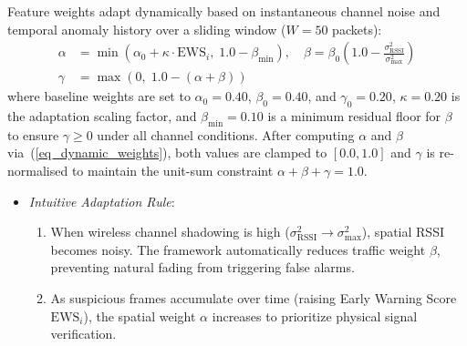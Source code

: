 \documentclass[conference]{IEEEtran}
\begin{document}
Feature weights adapt dynamically based on instantaneous channel noise and temporal anomaly history over a sliding window ($W=50$ packets):
\begin{equation}
\label{eq_dynamic_weights}
\begin{aligned}
\alpha &= \min\!\left(\alpha_0 + \kappa \cdot \text{EWS}_i,\; 1.0 - \beta_{\min}\right), \quad \beta = \beta_0 \left(1.0 - \frac{\sigma_{\text{RSSI}}^2}{\sigma_{\text{max}}^2}\right) \\
\gamma &= \max\!\left(0,\; 1.0 - (\alpha + \beta)\right)
\end{aligned}
\end{equation}
where baseline weights are set to $\alpha_0 = 0.40$, $\beta_0 = 0.40$, and $\gamma_0 = 0.20$, $\kappa = 0.20$ is the adaptation scaling factor, and $\beta_{\min} = 0.10$ is a minimum residual floor for $\beta$ to ensure $\gamma \ge 0$ under all channel conditions. After computing $\alpha$ and $\beta$ via~(\ref{eq_dynamic_weights}), both values are clamped to $[0.0, 1.0]$ and $\gamma$ is re-normalised to maintain the unit-sum constraint $\alpha + \beta + \gamma = 1.0$.
\begin{itemize}
    \item \textit{Intuitive Adaptation Rule}: 
    \begin{enumerate}
        \item When wireless channel shadowing is high ($\sigma_{\text{RSSI}}^2 \to \sigma_{\text{max}}^2$), spatial RSSI becomes noisy. The framework automatically reduces traffic weight $\beta$, preventing natural fading from triggering false alarms.
        \item As suspicious frames accumulate over time (raising Early Warning Score $\text{EWS}_i$), the spatial weight $\alpha$ increases to prioritize physical signal verification.
    \end{enumerate}
\end{itemize}
\end{document}
